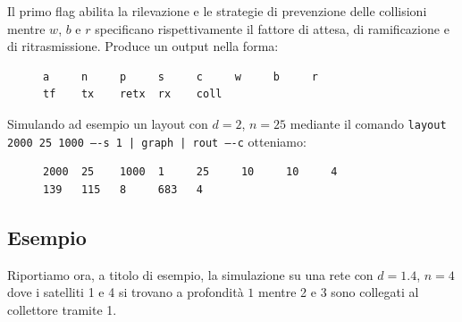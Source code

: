 \documentclass[a4paper,11pt]{article}
\theoremstyle{definition}
\begin{document}
Il primo flag abilita la rilevazione e le strategie di prevenzione delle collisioni mentre $w$, $b$ e $r$ specificano rispettivamente il fattore di attesa, di ramificazione e di ritrasmissione. Produce un output nella forma:

\begin{figure}[H]
\centering
\begin{BVerbatim}
a     n     p     s     c     w     b     r
tf    tx    retx  rx    coll
\end{BVerbatim}
\end{figure}

Simulando ad esempio un layout con $d=2$, $n=25$ mediante il comando \texttt{layout 2000 25 1000 ----s 1 | graph | rout ----c} otteniamo:

\begin{figure}[H]
\centering
\begin{BVerbatim}
2000  25    1000  1     25     10     10     4
139   115   8     683   4
\end{BVerbatim}
\end{figure}

\subsection{Esempio}

Riportiamo ora, a titolo di esempio, la simulazione su una rete con $d=1.4$, $n=4$ dove i satelliti 1 e 4 si trovano a profondità $1$ mentre 2 e 3 sono collegati al collettore tramite 1.

\end{document}
